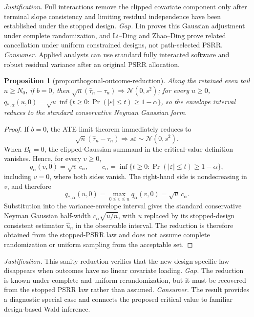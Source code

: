 \documentclass{article}
\newtheorem{proposition}{Proposition}
\begin{document}
\par\smallskip\noindent \textit{Justification.} Full interactions remove the clipped covariate component only after terminal slope consistency and limiting residual independence have been established under the stopped design. \textit{Gap.} Lin proves this Gaussian adjustment under complete randomization, and Li--Ding and Zhao--Ding prove related cancellation under uniform constrained designs, not path-selected PSRR. \textit{Consumer.} Applied analysts can use standard fully interacted software and robust residual variance after an original PSRR allocation.

\begin{proposition}[prop:orthogonal-outcome-reduction]\label{prop:orthogonal-outcome-reduction}
Along the retained even tail \(n\ge N_0\), if \(b=0\), then \(\sqrt n(\widehat\tau_n-\tau_n)\Rightarrow\mathcal N(0,s^2)\); for every \(u\ge0\), \(q_{*,\alpha}(u,0)=\sqrt u\inf\{t\ge0:\Pr(|\varepsilon|\le t)\ge1-\alpha\}\), so the envelope interval reduces to the standard conservative Neyman Gaussian form.
\end{proposition}
\begin{proof}
If \(b=0\), the ATE limit theorem immediately reduces to
\[
 \sqrt n(\widehat\tau_n-\tau_n)\Rightarrow s\varepsilon
 \sim\mathcal N(0,s^2). \tag{25}
\]
When \(B_0=0\), the clipped-Gaussian summand in the critical-value definition vanishes.  Hence, for every \(v\ge0\),
\[
 q_\alpha(v,0)=\sqrt v\,c_\alpha,
 \qquad
 c_\alpha=\inf\{t\ge0:\Pr(|\varepsilon|\le t)\ge1-\alpha\}, \tag{26}
\]
including \(v=0\), where both sides vanish.  The right-hand side is nondecreasing in \(v\), and therefore
\[
 q_{*,\alpha}(u,0)
 =\max_{0\le v\le u}q_\alpha(v,0)
 =\sqrt u\,c_\alpha. \tag{27}
\]
Substitution into the variance-envelope interval gives the standard conservative Neyman Gaussian half-width \(c_\alpha\sqrt{u/n}\), with \(u\) replaced by its stopped-design consistent estimator \(\widehat u_n\) in the observable interval.  The reduction is therefore obtained from the stopped-PSRR law and does not assume complete randomization or uniform sampling from the acceptable set.
\end{proof}
\par\smallskip\noindent \textit{Justification.} This sanity reduction verifies that the new design-specific law disappears when outcomes have no linear covariate loading. \textit{Gap.} The reduction is known under complete and uniform rerandomization, but it must be recovered from the stopped PSRR law rather than assumed. \textit{Consumer.} The result provides a diagnostic special case and connects the proposed critical value to familiar design-based Wald inference.
\end{document}
